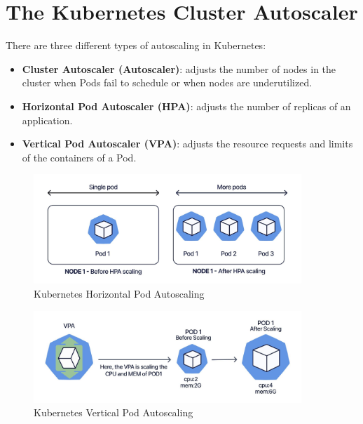 \section{The Kubernetes Cluster Autoscaler}\label{section:background_autoscaler}

There are three different types of autoscaling in Kubernetes:
\begin{itemize}
  \tightlist
  \item \textbf{Cluster Autoscaler (Autoscaler)}: adjusts the number of nodes in the
  cluster when Pods fail to schedule or when nodes are underutilized.
  \item \textbf{Horizontal Pod Autoscaler (HPA)}: adjusts the number of replicas
  of an application.
  \item \textbf{Vertical Pod Autoscaler (VPA)}: adjusts the resource requests and limits of the containers of a Pod.
\end{itemize}
\begin{figure}[ht]
  \centering
  \includegraphics[width=0.9\textwidth]{resources/hpa-autoscaling-blue.png}
  \caption{Kubernetes Horizontal Pod Autoscaling}
\end{figure}

\begin{figure}[ht]
  \centering
  \includegraphics[width=0.9\textwidth]{resources/vpa-diagram-blue.png}
  \caption{Kubernetes Vertical Pod Autoscaling}
\end{figure}

